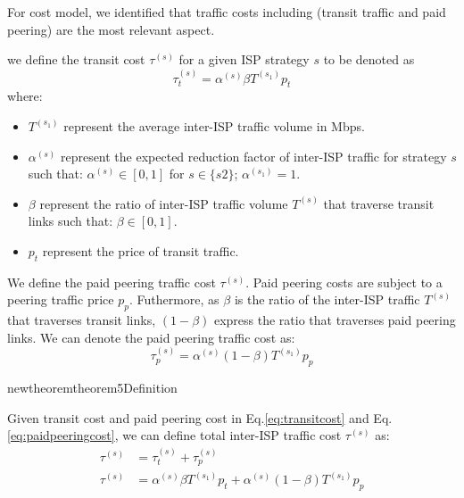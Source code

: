 \documentclass[paper]{ieice}
\begin{document}
For cost model, we identified that traffic costs including (transit traffic and paid peering) are the most relevant aspect. 
\newtheorem{theorem3}{Definition}
\begin{theorem}
we define the transit cost $\tau^{(s)}$ for a given ISP strategy $s$ to be denoted as 
\begin{equation}\label{eq:transitcost}
	\tau^{(s)}_t = \alpha^{(s)} \beta T^{(s_1)} p_t
\end{equation}
where:
\begin{itemize}
	\item $T^{(s_1)}$ represent the average inter-ISP traffic volume in Mbps.
	\item $\alpha^{(s)}$ represent the expected reduction factor of inter-ISP traffic for strategy $s$ such that: $\alpha^{(s)} \in [0,1]$ for $s \in \{s2\}$;  $\alpha^{(s_1)} = 1$.
	\item $\beta$ represent the ratio of inter-ISP traffic volume $T^{(s)}$ that traverse transit links such that: $\beta \in [0,1]$.
	\item $p_t$ represent the price of transit traffic.
\end{itemize}
\end{theorem}

\newtheorem{theorem4}{Definition}
\begin{theorem}
We define the paid peering traffic cost $\tau^{(s)}$. 
Paid peering costs are subject to a peering traffic price $p_p$.
Futhermore, as $\beta$ is the ratio of the inter-ISP traffic $T^{(s)}$ that traverses transit links, $(1-\beta)$ express the ratio that traverses paid peering links.
We can denote the paid peering traffic cost as:
\begin{equation}\label{eq:paidpeeringcost}
	\tau^{(s)}_p = \alpha^{(s)} (1-\beta) T^{(s_1)} p_p
\end{equation}
\end{theorem}

newtheorem{theorem5}{Definition}
\begin{theorem}
Given transit cost and paid peering cost in Eq.\ref{eq:transitcost} and Eq.\ref{eq:paidpeeringcost}, we can define total inter-ISP traffic cost $\tau^{(s)}$ as:
\begin{align}
	\tau^{(s)} &= \tau^{(s)}_t + \tau^{(s)}_p \\
	\tau^{(s)} &= \alpha^{(s)} \beta T^{(s_1)} p_t + \alpha^{(s)} (1-\beta) T^{(s_1)} p_p
\end{align}
\end{theorem}
\end{document}
